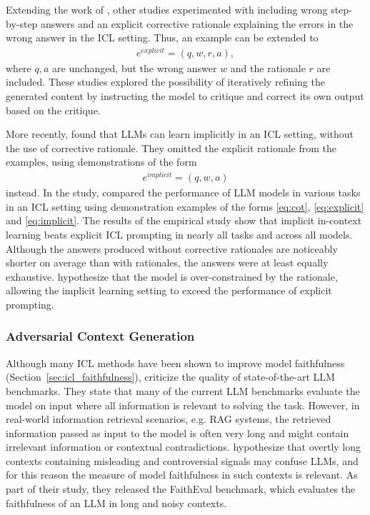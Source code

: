 \documentclass[english, 12pt, a4paper, sci, utf8, a-2b, online]{latex/definitions/aaltothesis}
\begin{document}
Extending the work of \textcite{wei2023chainofthoughtpromptingelicitsreasoning}, other studies \cite{madaan2023selfrefineiterativerefinementselffeedback, kim2023languagemodelssolvecomputer, shinn2023reflexionlanguageagentsverbal} experimented with including wrong step-by-step answers and an explicit corrective rationale explaining the errors in the wrong answer in the ICL setting. Thus, an example can be extended to
\begin{align} \label{eq:explicit}
    e^{explicit} = (q, w, r, a),
\end{align}
where $q, a$ are unchanged, but the wrong answer $w$ and the rationale $r$ are included. These studies explored the possibility of iteratively refining the generated content by instructing the model to critique and correct its own output based on the critique. 

More recently, \textcite{alazraki-etal-2025-need} found that LLMs can learn implicitly in an ICL setting, without the use of corrective rationale. They omitted the explicit rationale from the examples, using demonstrations of the form
\begin{align} \label{eq:implicit}
    e^{implicit} = (q, w, a)
\end{align}
instead. In the study, \textcite{alazraki-etal-2025-need} compared the performance of LLM models in various  tasks in an ICL setting using demonstration examples of the forms \ref{eq:cot}, \ref{eq:explicit} and \ref{eq:implicit}. The results of the empirical study show that implicit in-context learning beats explicit ICL prompting in nearly all tasks and across all models. Although the answers produced without corrective rationales are noticeably shorter on average than with rationales, the answers were at least equally exhaustive. \textcite{alazraki-etal-2025-need} hypothesize that the model is over-constrained by the rationale, allowing the implicit learning setting to exceed the performance of explicit prompting.

\subsubsection{Adversarial Context Generation} \label{sec:context_gen}

Although many ICL methods have been shown to improve model faithfulness (Section~\ref{sec:icl_faithfulness}), \textcite{shi2023largelanguagemodelseasily} criticize the quality of state-of-the-art LLM benchmarks. They state that many of the current LLM benchmarks evaluate the model on input where all information is relevant to solving the task. However, in real-world information retrieval scenarios, e.g. RAG systems, the retrieved information passed as input to the model is often very long and might contain irrelevant information or contextual contradictions. \textcite{ming2025faithevallanguagemodelstay} hypothesize that overtly long contexts containing misleading and controversial signals may confuse LLMs, and for this reason the measure of model faithfulness in such contexts is relevant. As part of their study, they released the FaithEval benchmark, which evaluates the faithfulness of an LLM in long and noisy contexts.
\end{document}
